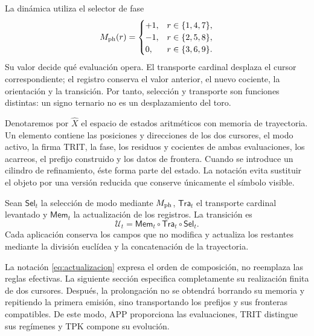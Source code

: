 La dinámica utiliza el selector de fase
\[
 M_{\rm ph}(r)=
 \begin{cases}
 +1,&r\in\{1,4,7\},\\
 -1,&r\in\{2,5,8\},\\
 0,&r\in\{3,6,9\}.
 \end{cases}
\]
Su valor decide qué evaluación opera. El transporte cardinal desplaza el cursor correspondiente; el registro conserva el valor anterior, el nuevo cociente, la orientación y la transición. Por tanto, selección y transporte son funciones distintas: un signo ternario no es un desplazamiento del toro.

Denotaremos por \(\widehat X\) el espacio de estados aritméticos con memoria de trayectoria. Un elemento contiene las posiciones y direcciones de los dos cursores, el modo activo, la firma TRIT, la fase, los residuos y cocientes de ambas evaluaciones, los acarreos, el prefijo construido y los datos de frontera. Cuando se introduce un cilindro de refinamiento, éste forma parte del estado. La notación evita sustituir el objeto por una versión reducida que conserve únicamente el símbolo visible.

\begin{definition}
Sean \(\mathsf{Sel}_t\) la selección de modo mediante \(M_{\rm ph}\), \(\mathsf{Tra}_t\) el transporte cardinal levantado y \(\mathsf{Mem}_t\) la actualización de los registros. La transición es
\begin{equation}
 \mathcal U_t=\mathsf{Mem}_t\circ\mathsf{Tra}_t\circ\mathsf{Sel}_t.
 \label{eq:actualizacion}
\end{equation}
Cada aplicación conserva los campos que no modifica y actualiza los restantes mediante la división euclídea y la concatenación de la trayectoria.
\end{definition}

La notación \eqref{eq:actualizacion} expresa el orden de composición, no reemplaza las reglas efectivas. La siguiente sección especifica completamente su realización finita de dos cursores. Después, la prolongación no se obtendrá borrando su memoria y repitiendo la primera emisión, sino transportando los prefijos y sus fronteras compatibles. De este modo, APP proporciona las evaluaciones, TRIT distingue sus regímenes y TPK compone su evolución.





